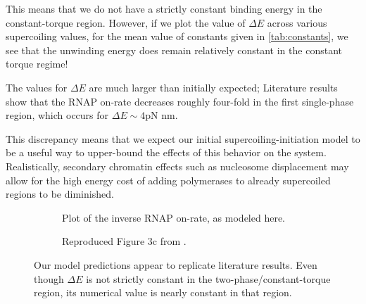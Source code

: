 \documentclass[11pt]{article}
\begin{document}
This means that we do not have a strictly constant binding energy in the constant-torque region. However, if we plot the value of \(\Delta E\) across various supercoiling values, for the mean value of constants given in \autoref{tab:constants}, we see that the unwinding energy does remain relatively constant in the constant torque regime!

The values for \(\Delta E\) are much larger than initially expected; Literature results show that the RNAP on-rate decreases roughly four-fold in the first single-phase region, which occurs for \(\Delta E \sim 4 \text{pN nm}\).

This discrepancy means that we expect our initial supercoiling-initiation model to be a useful way to upper-bound the effects of this behavior on the system. Realistically, secondary chromatin effects such as nucleosome displacement may allow for the high energy cost of adding polymerases to already supercoiled regions to be diminished.

\begin{figure}[h]
    \centering
    \begin{subfigure}{.49\linewidth}
        \centering
        \caption{Plot of the inverse RNAP on-rate, as modeled here.}
    \end{subfigure}
    \begin{subfigure}{.49\linewidth}
        \centering
        \caption{Reproduced Figure 3c from \textcite{revyakinPromoterUnwindingPromoter2004}.}
    \end{subfigure}
    \caption{Our model predictions appear to replicate literature results. Even though \(\Delta E\) is not strictly constant in the two-phase/constant-torque region, its numerical value is nearly constant in that region.}
\end{figure}
\end{document}
